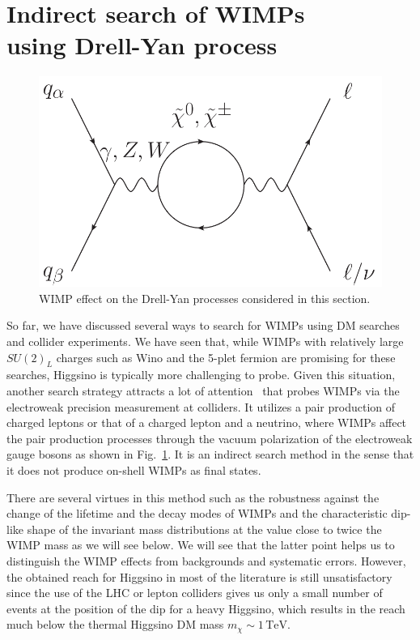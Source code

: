 \documentclass[12pt,twoside,book]{article}
\begin{document}
\section[Indirect search of WIMPs using Drell-Yan process]{
  Indirect search of WIMPs\\
  using Drell-Yan process
}
\label{sec:dy}
\setcounter{equation}{0}

\vskip 0.1in

\begin{figure}[b]
  \centering
  \includegraphics[width=0.5\hsize]{NC_CC_WIMP.pdf}
  \caption{WIMP effect on the Drell-Yan processes considered in this section.}
  \label{fig:NC_CC_WIMP}
\end{figure}

So far, we have discussed several ways to search for WIMPs using DM searches and collider experiments.
We have seen that, while WIMPs with relatively large $SU(2)_L$ charges such as Wino and the 5-plet fermion are promising for these searches, Higgsino is typically more challenging to probe.
Given this situation, another search strategy attracts a lot of attention~\cite{Chigusa:2018vxz, Abe:2019egv, Alves:2014cda, Harigaya:2015yaa, Gross:2016ioi, Farina:2016rws, Matsumoto:2017vfu, DiLuzio:2018jwd, Matsumoto:2018ioi} that probes WIMPs via the electroweak precision measurement at colliders.
It utilizes a pair production of charged leptons or that of a charged lepton and a neutrino, where WIMPs affect the pair production processes through the vacuum polarization of the electroweak gauge bosons as shown in Fig.~\ref{fig:NC_CC_WIMP}.
It is an indirect search method in the sense that it does not produce on-shell WIMPs as final states.

There are several virtues in this method such as the robustness against the change of the lifetime and the decay modes of WIMPs and the characteristic dip-like shape of the invariant mass distributions at the value close to twice the WIMP mass as we will see below.
We will see that the latter point helps us to distinguish the WIMP effects from backgrounds and systematic errors.
However, the obtained reach for Higgsino in most of the literature is still unsatisfactory since the use of the LHC or lepton colliders gives us only a small number of events at the position of the dip for a heavy Higgsino, which results in the reach much below the thermal Higgsino DM mass $m_\chi \sim 1\,\mathrm{TeV}$.
\end{document}
